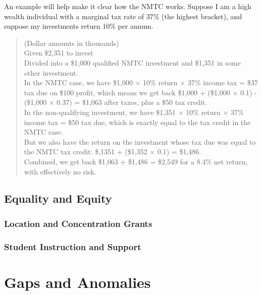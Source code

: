 An example will help make it clear how the NMTC works. Suppose I am a high wealth individual with a marginal tax rate of 37\% (the highest bracket), and suppose my investments return 10\% per annum.
\begin{quotation}
  \noindent{}(Dollar amounts in thousands) \\
  \noindent{}Given \$2,351 to invest \\
  \noindent{}Divided into a \$1,000 qualified NMTC investment and \$1,351 in some other investment. \\
  \noindent{}In the NMTC case, we have \$1,000 $\times$ 10\% return $\times$ 37\% income tax = \$37 tax due on \$100 profit, which means we get back \$1,000 + (\$1,000 $\times$ 0.1) - (\$1,000 $\times$ 0.37) = \$1,063 after taxes, plus a \$50 tax credit. \\

  \noindent{}In the non-qualifying investment, we have \$1,351 $\times$ 10\% return $\times$ 37\% income tax = \$50 tax due, which is exactly equal to the tax credit in the NMTC case.\\
  \noindent{}But we also have the return on the investment whose tax due was equal to the NMTC tax credit: \$,1351 + (\$1,352 $\times$ 0.1) = \$1,486.\\
  \noindent{}Combined, we get back \$1,063 + \$1,486 = \$2,549 for a 8.4\% net return, with effectively no risk. 
\end{quotation}

\subsection{Equality and Equity}\indent%
\label{sec:equality_equity}

\subsubsection{Location and Concentration Grants}\indent%
\label{sec:tax-credit}

\subsubsection{Student Instruction and Support}\indent%
\label{student_instruction_support}

\section{Gaps and Anomalies}\indent%
\label{sec:findings-gaps-anomolies}

